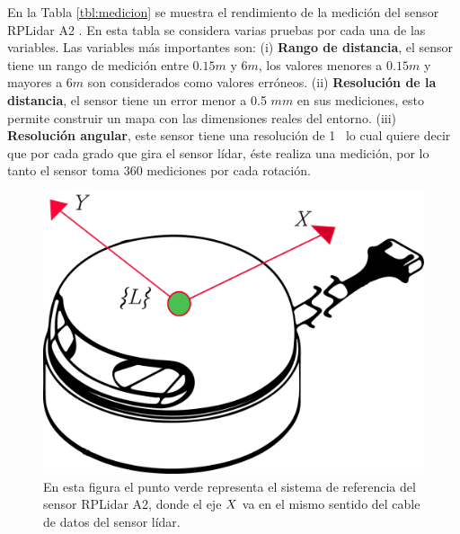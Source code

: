 En la Tabla \ref{tbl:medicion} se muestra el rendimiento de la medición del 
sensor RPLidar A2 \cite{Slamtec}. En esta tabla se considera varias pruebas 
por cada una de las variables. Las variables más importantes son: (i) 
\textbf{Rango de distancia}, el sensor tiene un rango de medición entre $0.15 
m$ y $6 m$, los valores menores a $0.15 m$ y mayores a $6 m$ son 
considerados como valores erróneos. (ii) \textbf{Resolución de la 
distancia}, el sensor tiene un error menor a 0.5 $mm$ en sus mediciones, esto 
permite construir un mapa con las dimensiones reales del entorno. (iii) 
\textbf{Resolución angular}, este sensor tiene una resolución de 1\grad~ lo cual 
quiere decir que por cada grado que gira el sensor lídar, éste realiza una medición, 
por lo tanto el sensor toma 360 mediciones por cada rotación.

\begin{figure}
	\centering \footnotesize
	\includegraphics[width=0.40\linewidth]{images/frame_laser.png}
	\captionsetup{font=footnotesize}
	\caption{En esta figura el punto verde representa el sistema de referencia 
	del sensor RPLidar A2, donde el eje $\mathnormal X$ va en el mismo sentido del cable 
	de datos del sensor lídar.}
	\label{fig:FrameLidar}
\end{figure}

